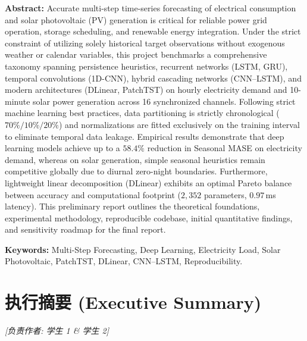 \documentclass[11pt,a4paper,UTF8]{ctexart}
\begin{document}
\vspace{0.4em}
\noindent\textbf{Abstract: } Accurate multi-step time-series forecasting of electrical consumption and solar photovoltaic (PV) generation is critical for reliable power grid operation, storage scheduling, and renewable energy integration. Under the strict constraint of utilizing solely historical target observations without exogenous weather or calendar variables, this project benchmarks a comprehensive taxonomy spanning persistence heuristics, recurrent networks (LSTM, GRU), temporal convolutions (1D-CNN), hybrid cascading networks (CNN--LSTM), and modern architectures (DLinear, PatchTST) on hourly electricity demand and 10-minute solar power generation across 16 synchronized channels. Following strict machine learning best practices, data partitioning is strictly chronological ($70\% / 10\% / 20\%$) and normalizations are fitted exclusively on the training interval to eliminate temporal data leakage. Empirical results demonstrate that deep learning models achieve up to a $58.4\%$ reduction in Seasonal MASE on electricity demand, whereas on solar generation, simple seasonal heuristics remain competitive globally due to diurnal zero-night boundaries. Furthermore, lightweight linear decomposition (DLinear) exhibits an optimal Pareto balance between accuracy and computational footprint ($2,352$ parameters, $0.97$\,ms latency). This preliminary report outlines the theoretical foundations, experimental methodology, reproducible codebase, initial quantitative findings, and sensitivity roadmap for the final report.

\vspace{0.3em}
\noindent\textbf{Keywords: } Multi-Step Forecasting, Deep Learning, Electricity Load, Solar Photovoltaic, PatchTST, DLinear, CNN--LSTM, Reproducibility.

\section*{执行摘要 (Executive Summary)}
\noindent\textit{[负责作者: 学生 1 \& 学生 2]}
\end{document}
